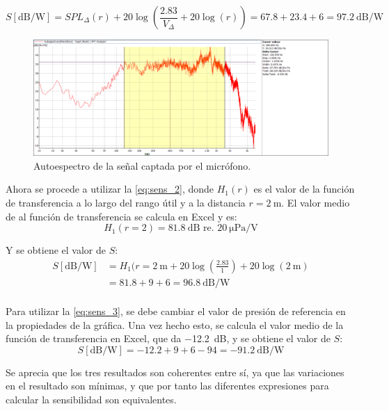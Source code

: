 \documentclass[10pt]{article}
\begin{document}
\[ S \left[ \unit{\dB\per\watt} \right] = SPL_{\Delta}(r) + 20 \log \left( \frac{2.83}{V_{\Delta}} + 20 \log \left( r \right)  \right) = 67.8 + 23.4 + 6 = \boxed{\qty{97.2}{\dB\per\watt}} \]

\begin{figure}[hbtp]
  \centering
  \includegraphics[width=\linewidth]{Picture2.png}
  \caption{Autoespectro de la señal captada por el micrófono.}
  \label{fig:Picture2}
\end{figure}

Ahora se procede a utilizar la \autoref{eq:sens_2}, donde $H_1(r)$ es el valor de la función de transferencia a lo largo del rango útil y a la distancia $r=\qty{2}{\metre }$. El valor medio de al función de transferencia se calcula en Excel y es:
\[ H_1(r=2) = \qty{81.8}{\dB} \text{ re. } \SI{20}{\micro\pascal\per\volt} \]

Y se obtiene el valor de $S$:
\begin{align*}
  S \left[ \unit{\dB\per\watt} \right] & = H_1(r=\qty{2}{\metre } + 20 \log \left( \frac{2.83}{1} \right) + 20 \log \left( \qty{2}{\metre } \right) \\
                                       & = 81.8 + 9 + 6 = \boxed{\qty{96.8}{\dB\per\watt}}                                                          \\
\end{align*}

Para utilizar la \autoref{eq:sens_3}, se debe cambiar el valor de presión de referencia en la propiedades de la gráfica. Una vez hecho esto, se calcula el valor medio de la función de transferencia en Excel, que da \qty{-12.2}{\dB}, y se obtiene el valor de $S$:
\[ S \left[ \unit{\dB\per\watt} \right] = -12.2 + 9 + 6 - 94 = \boxed{\qty{-91.2}{\dB\per\watt}} \]

Se aprecia que los tres resultados son coherentes entre sí, ya que las variaciones en el resultado son mínimas, y que por tanto las diferentes expresiones para calcular la sensibilidad son equivalentes.
\end{document}
